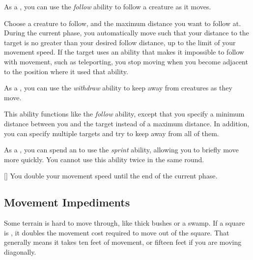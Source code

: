          As a , you can use the \textit{follow} ability to follow a creature as it moves.

        \begin{freeability}{}
            Choose a creature to follow, and the maximum distance you want to follow at.
            During the current phase, you automatically move such that your distance to the target is no greater than your desired follow distance, up to the limit of your movement speed.
            If the target uses an ability that makes it impossible to follow with movement, such as teleporting, you stop moving when you become adjacent to the position where it used that ability.
        \end{freeability}

         As a , you can use the \textit{withdraw} ability to keep away from creatures as they move.

        \begin{freeability}{}
            This ability functions like the \textit{follow} ability, except that you specify a minimum distance between you and the target instead of a maximum distance.
            In addition, you can specify multiple targets and try to keep away from all of them.
        \end{freeability}

         As a , you can spend an  to use the \textit{sprint} ability, allowing you to briefly move more quickly.
        You cannot use this ability twice in the same round.

        \begin{apability}{}[]
            You double your movement speed until the end of the current phase.
        \end{apability}

    \subsection{Movement Impediments}

        \label{Difficult Terrain}
        Some terrain is hard to move through, like thick bushes or a swamp.
        If a square is , it doubles the movement cost required to move out of the square.
        That generally means it takes ten feet of movement, or fifteen feet if you are moving diagonally.

